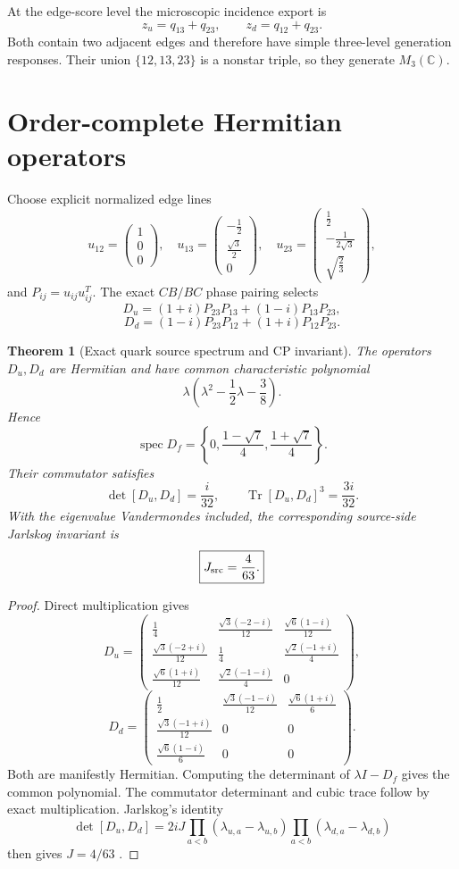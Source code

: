 \documentclass[11pt,oneside,openany]{book}
\numberwithin{equation}{chapter}
\newtheorem{theorem}{Theorem}[chapter]
\theoremstyle{definition}
\theoremstyle{remark}
\newcommand{\C}{\mathbb C}
\newcommand{\Tr}{\operatorname{Tr}}
\newcommand{\spec}{\operatorname{spec}}
\begin{document}
At the edge-score level the microscopic incidence export is
\[
 z_u=q_{13}+q_{23},
 \qquad
 z_d=q_{12}+q_{23}.
\]
Both contain two adjacent edges and therefore have simple three-level generation responses.  Their union $\{12,13,23\}$ is a nonstar triple, so they generate $M_3(\C)$.

\section{Order-complete Hermitian operators}
Choose explicit normalized edge lines
\[
 u_{12}=\begin{pmatrix}1\\0\\0\end{pmatrix},\quad
 u_{13}=\begin{pmatrix}-\frac12\\\frac{\sqrt3}{2}\\0\end{pmatrix},\quad
 u_{23}=\begin{pmatrix}\frac12\\-\frac1{2\sqrt3}\\\sqrt{\frac23}\end{pmatrix},
\]
and $P_{ij}=u_{ij}u_{ij}^T$.  The exact $CB/BC$ phase pairing selects
\[
 D_u=(1+i)P_{23}P_{13}+(1-i)P_{13}P_{23},
\]
\[
 D_d=(1-i)P_{23}P_{12}+(1+i)P_{12}P_{23}.
\]

\begin{theorem}[Exact quark source spectrum and CP invariant]
\label{thm:quark-source-CP}
The operators $D_u,D_d$ are Hermitian and have common characteristic polynomial
\[
 \lambda\left(\lambda^2-\frac12\lambda-\frac38\right).
\]
Hence
\[
 \spec D_f
 =\left\{0,\frac{1-\sqrt7}{4},\frac{1+\sqrt7}{4}\right\}.
\]
Their commutator satisfies
\[
 \boxed{
 \det[D_u,D_d]=\frac{i}{32},
 \qquad
 \Tr[D_u,D_d]^3=\frac{3i}{32}.
 }
\]
With the eigenvalue Vandermondes included, the corresponding source-side Jarlskog invariant is
\[
 \boxed{J_{\rm src}=\frac4{63}.}
\]
\end{theorem}

\begin{proof}
Direct multiplication gives
\[
D_u=
\begin{pmatrix}
\frac14&\frac{\sqrt3(-2-i)}{12}&\frac{\sqrt6(1-i)}{12}\\
\frac{\sqrt3(-2+i)}{12}&\frac14&\frac{\sqrt2(-1+i)}4\\
\frac{\sqrt6(1+i)}{12}&\frac{\sqrt2(-1-i)}4&0
\end{pmatrix},
\]
\[
D_d=
\begin{pmatrix}
\frac12&\frac{\sqrt3(-1-i)}{12}&\frac{\sqrt6(1+i)}6\\
\frac{\sqrt3(-1+i)}{12}&0&0\\
\frac{\sqrt6(1-i)}6&0&0
\end{pmatrix}.
\]
Both are manifestly Hermitian.  Computing the determinant of $\lambda I-D_f$ gives the common polynomial.  The commutator determinant and cubic trace follow by exact multiplication.  Jarlskog's identity
\[
 \det[D_u,D_d]=2iJ\prod_{a<b}(\lambda_{u,a}-\lambda_{u,b})
 \prod_{a<b}(\lambda_{d,a}-\lambda_{d,b})
\]
then gives $J=4/63$ \cite{Jarlskog1985}.
\end{proof}
\end{document}
